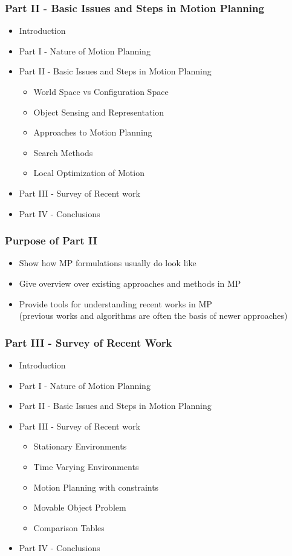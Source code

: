 \documentclass[8pt]{beamer}
\begin{document}
\begin{frame}
\frametitle{Part II - Basic Issues and Steps in Motion Planning}
\begin{itemize}
\item Introduction
\item Part I - Nature of Motion Planning
\item Part II - Basic Issues and Steps in Motion Planning
\begin{itemize}
\item World Space vs Configuration Space
\item Object Sensing and Representation
\item Approaches to Motion Planning
\item Search Methods
\item Local Optimization of Motion
\end{itemize}
\item Part III - Survey of Recent work
\item Part IV - Conclusions
\end{itemize}
\end{frame}

\begin{frame}
\frametitle{Purpose of Part II}
\begin{itemize}
\item Show how MP formulations usually do look like
\item Give overview over existing approaches and methods in MP
\item Provide tools for understanding recent works in MP\\
(previous works and algorithms are often the basis of newer approaches)
\end{itemize}
\end{frame}

\begin{frame}
\frametitle{Part III - Survey of Recent Work}
\begin{itemize}
\item Introduction
\item Part I - Nature of Motion Planning
\item Part II - Basic Issues and Steps in Motion Planning
\item Part III - Survey of Recent work
\begin{itemize}
\item Stationary Environments
\item Time Varying Environments
\item Motion Planning with constraints
\item Movable Object Problem
\item Comparison Tables
\end{itemize}
\item Part IV - Conclusions
\end{itemize}
\end{frame}
\end{document}
